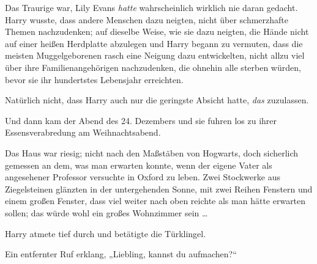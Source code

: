 Das Traurige war, Lily Evans \emph{hatte} wahrscheinlich wirklich nie daran gedacht. Harry wusste, dass andere Menschen dazu neigten, nicht über schmerzhafte Themen nachzudenken; auf dieselbe Weise, wie sie dazu neigten, die Hände nicht auf einer heißen Herdplatte abzulegen und Harry begann zu vermuten, dass die meisten Muggelgeborenen rasch eine Neigung dazu entwickelten, nicht allzu viel über ihre Familienangehörigen nachzudenken, die ohnehin alle sterben würden, bevor sie ihr hundertstes Lebensjahr erreichten.

Natürlich nicht, dass Harry auch nur die geringste Absicht hatte, \emph{das} zuzulassen.

Und dann kam der Abend des 24. Dezembers und sie fuhren los zu ihrer Essensverabredung am Weihnachtsabend.

\later

Das Haus war riesig; nicht nach den Maßstäben von Hogwarts, doch sicherlich gemessen an dem, was man erwarten konnte, wenn der eigene Vater als angesehener Professor versuchte in Oxford zu leben. Zwei Stockwerke aus Ziegelsteinen glänzten in der untergehenden Sonne, mit zwei Reihen Fenstern und einem großen Fenster, dass viel weiter nach oben reichte als man hätte erwarten sollen; das würde wohl ein großes Wohnzimmer sein …

Harry atmete tief durch und betätigte die Türklingel.

Ein entfernter Ruf erklang,
„Liebling, kannst du aufmachen?“

